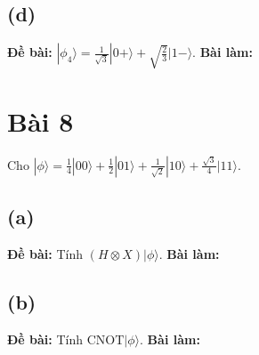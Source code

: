 \subsection{(d)}
\textbf{Đề bài:} $|\phi_{4}\rangle=\frac{1}{\sqrt{3}}|0+\rangle+\sqrt{\frac{2}{3}}|1-\rangle$.
\textbf{Bài làm:}

\section{Bài 8}
Cho $|\phi\rangle=\frac{1}{4}|00\rangle+\frac{1}{2}|01\rangle+\frac{1}{\sqrt{2}}|10\rangle+\frac{\sqrt{3}}{4}|11\rangle$.

\subsection{(a)}
\textbf{Đề bài:} Tính $(H\otimes X)|\phi\rangle$.
\textbf{Bài làm:}

\subsection{(b)}
\textbf{Đề bài:} Tính $\mathrm{CNOT}|\phi\rangle$.
\textbf{Bài làm:}